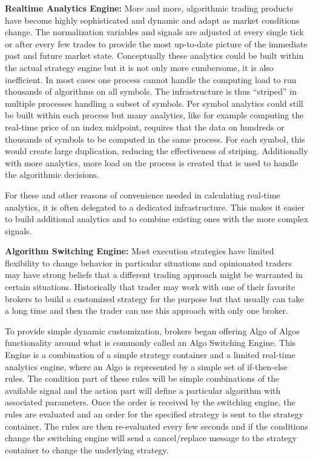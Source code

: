 \noindent\textbf{Realtime Analytics Engine:} More and more, algorithmic trading products have become highly sophisticated and dynamic and adapt as market conditions change. The normalization variables and signals are adjusted at every single tick or after every few trades to provide the most up-to-date picture of the immediate past and future market state. Conceptually these analytics could be built within the actual strategy engine but it is not only more cumbersome, it is also inefficient. In most cases one process cannot handle the computing load to run thousands of algorithms on all symbols. The infrastructure is thus ``striped'' in multiple processes handling a subset of symbols. Per symbol analytics could still be built within each process but many analytics, like for example computing the real-time price of an index midpoint, requires that the data on hundreds or thousands of symbols to be computed in the same process. For each symbol, this would create large duplication, reducing the effectiveness of striping. Additionally with more analytics, more load on the process is created that is used to handle the algorithmic decisions.


For these and other reasons of convenience needed in calculating real-time analytics, it is often delegated to a dedicated infrastructure. This makes it easier to build additional analytics and to combine existing ones with the more complex signals. \twomedskip


\noindent\textbf{Algorithm Switching Engine:} Most execution strategies have limited flexibility to change behavior in particular situations and opinionated traders may have strong beliefs that a different trading approach might be warranted in certain situations. Historically that trader may work with one of their favorite brokers to build a customized strategy for the purpose but that usually can take a long time and then the trader can use this approach with only one broker. 


To provide simple dynamic customization, brokers began offering Algo of Algos functionality around what is commonly called an Algo Switching Engine. This Engine is a combination of a simple strategy container and a limited real-time analytics engine, where an Algo is represented by a simple set of if-then-else rules. The condition  part of these rules will be simple combinations of the available signal and the action part will define a particular algorithm with associated parameters. Once the order is received by the switching engine, the rules are evaluated and an order for the specified strategy is sent to the strategy container. The rules are then re-evaluated every few seconds and if the conditions change the switching engine will send a cancel/replace message to the strategy container to change the underlying strategy. \twomedskip


